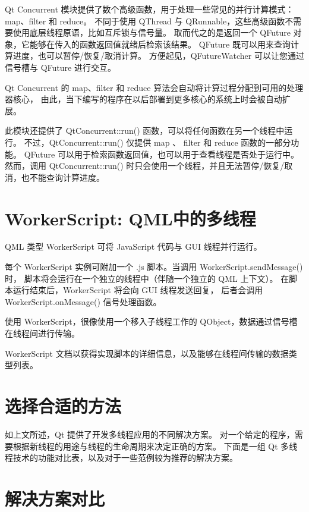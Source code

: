 Qt Concurrent 模块提供了数个高级函数，用于处理一些常见的并行计算模式：map、filter 和 reduce。
不同于使用 QThread 与 QRunnable，这些高级函数不需要使用底层线程原语，比如互斥锁与信号量。
取而代之的是返回一个 QFuture 对象，它能够在传入的函数返回值就绪后检索该结果。
QFuture 既可以用来查询计算进度，也可以暂停/恢复/取消计算。
方便起见，QFutureWatcher 可以让您通过信号槽与 QFuture 进行交互。

Qt Concurrent 的 map、filter 和 reduce 算法会自动将计算过程分配到可用的处理器核心，
由此，当下编写的程序在以后部署到更多核心的系统上时会被自动扩展。

此模块还提供了 QtConcurrent::run() 函数，可以将任何函数在另一个线程中运行。
不过，QtConcurrent::run() 仅提供 map 、 filter 和 reduce 函数的一部分功能。
QFuture 可以用于检索函数返回值，也可以用于查看线程是否处于运行中。
然而，调用 QtConcurrent::run() 时只会使用一个线程，并且无法暂停/恢复/取消，也不能查询计算进度。



\section{WorkerScript: QML中的多线程}

QML 类型 WorkerScript 可将 JavaScript 代码与 GUI 线程并行运行。

每个 WorkerScript 实例可附加一个 .js 脚本。当调用 WorkerScript.sendMessage() 时，
脚本将会运行在一个独立的线程中（伴随一个独立的 QML 上下文）。
在脚本运行结束后，WorkerScript 将会向 GUI 线程发送回复，
后者会调用 WorkerScript.onMessage() 信号处理函数。

使用 WorkerScript，很像使用一个移入子线程工作的 QObject，数据通过信号槽在线程间进行传输。

\begin{notice}[另请参阅]
WorkerScript 文档以获得实现脚本的详细信息，以及能够在线程间传输的数据类型列表。
\end{notice}

\section{选择合适的方法}

如上文所述，Qt 提供了开发多线程应用的不同解决方案。
对一个给定的程序，需要根据新线程的用途与线程的生命周期来决定正确的方案。
下面是一组 Qt 多线程技术的功能对比表，以及对于一些范例较为推荐的解决方案。


\section{解决方案对比}

